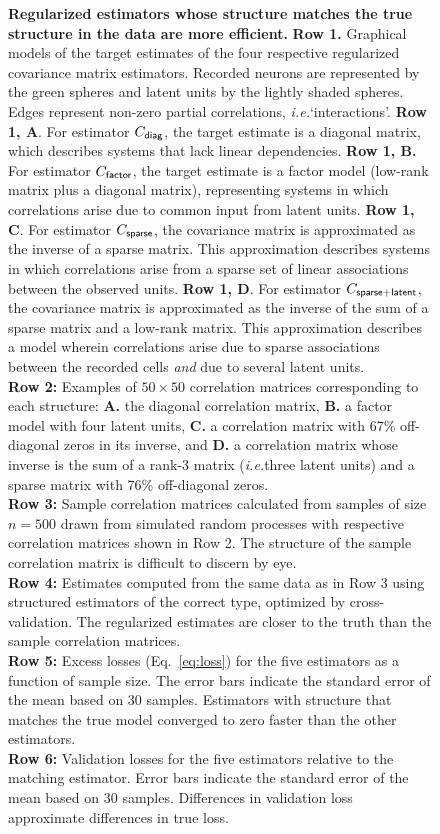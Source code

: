 \begin{figure}[h!]
\caption{
{\bf Regularized estimators whose structure matches the true structure in the data are more efficient.}
     {\bf Row 1.} Graphical models of the target estimates of the four respective regularized covariance matrix estimators.  Recorded neurons are represented by the green spheres and latent units by the lightly shaded spheres.  Edges represent non-zero partial correlations, \emph{i.e.}\;`interactions'.
     {\bf Row 1, A}.  For estimator $C_{\sf diag}$, the target estimate is a diagonal matrix, which describes systems that lack linear dependencies.
     {\bf  Row 1, B.} For estimator $C_{\sf factor}$, the target estimate is a factor model (low-rank matrix plus a diagonal matrix), representing systems in which correlations arise due to common input from latent units.
     {\bf  Row 1, C}. For estimator $C_{\sf sparse}$, the covariance matrix is approximated as the inverse of a sparse matrix. This approximation describes systems in which correlations arise from a sparse set of  linear associations between the observed units.
     {\bf  Row 1, D}.  For estimator $C_{\sf sparse+latent}$, the covariance matrix is approximated as the inverse of the sum of a sparse matrix and a low-rank matrix. This approximation describes a model wherein correlations arise due to sparse associations between the recorded cells \emph{and} due to several latent units.
     \\
     {\bf Row 2:} Examples of $50\times 50$ correlation matrices corresponding to each structure: {\bf A.} the diagonal correlation matrix, {\bf B.} a factor model with four latent units, {\bf C.}  a correlation matrix with 67\%  off-diagonal zeros in its inverse, and {\bf  D.} a correlation matrix whose inverse is the sum of a rank-3 matrix (\emph{i.e.}\;three latent units) and a sparse matrix with 76\% off-diagonal zeros.
     \\
{\bf Row 3:} Sample correlation matrices calculated from samples of size $n=500$ drawn from simulated random processes with respective correlation matrices shown in Row 2.  The structure of the sample correlation matrix is difficult to discern by eye.
     \\
{\bf Row 4:} Estimates computed from the same data as in Row 3 using structured estimators of the correct type, optimized by cross-validation.  The regularized estimates are closer to the truth than the sample correlation matrices.
     \\
{\bf Row 5:} Excess losses (Eq.~\ref{eq:loss}) for the five estimators as a function of sample size. The error bars indicate the standard error of the mean based on 30 samples.  Estimators with structure that matches the true model converged to zero faster than the other estimators.
     \\
{\bf Row 6:} Validation losses for the five estimators relative to the matching estimator. Error bars indicate the standard error of the mean based on 30 samples.  Differences in validation loss approximate differences in true loss.
}
\label{fig:1}
\end{figure}


